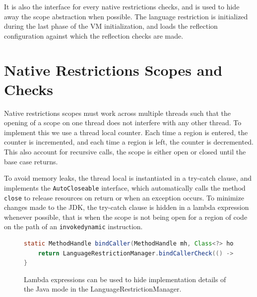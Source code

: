 It is also the interface for every native restrictions checks, and is used to hide away the scope abstraction when possible.
The language restriction is initialized during the last phase of the VM initialization, and loads the reflection configuration against which the reflection checks are made.
\section{Native Restrictions Scopes and Checks}
Native restrictions scopes must work across multiple threads such that the opening of a scope on one thread does not interfere with any other thread. To implement this we use a thread local counter.
Each time a region is entered, the counter is incremented, and each time a region is left, the counter is decremented. 
This also account for recursive calls, the scope is either open or closed until the base case returns.


To avoid memory leaks, the thread local is instantiated in a try-catch clause, and implements the \verb|AutoCloseable| interface, which automatically calls the method \verb|close| to release resources on return or when an exception occurs.
To minimize changes made to the JDK, the try-catch clause is hidden in a lambda expression whenever possible, that is when the scope is not being open for a region of code on the path of an \verb|invokedynamic| instruction.

\begin{figure}[ht]
    \centering
\begin{lstlisting}[language=Java]
static MethodHandle bindCaller(MethodHandle mh, Class<?> hostClass) {
    return LanguageRestrictionManager.bindCallerCheck(() -> BindCaller.bindCaller(mh, hostClass));
}
\end{lstlisting}
    \caption{Lambda expressions can be used to hide implementation details of the Java mode in the LanguageRestrictionManager.}
    \label{fig:bind_caller_lambda}
\end{figure}

